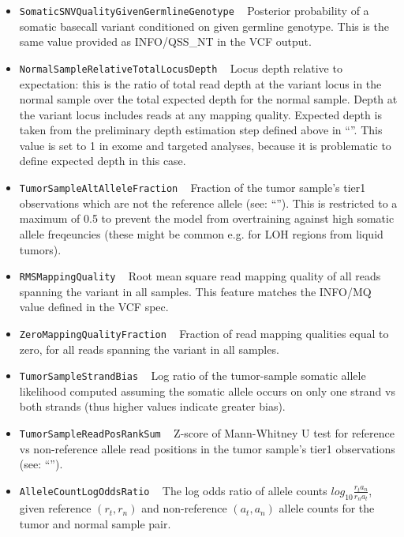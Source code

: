 \documentclass{article}
\begin{document}
\begin{itemize}

    \item \texttt{SomaticSNVQualityGivenGermlineGenotype} ~ Posterior probability of a somatic basecall variant conditioned on given germline genotype. This is the same value provided as INFO/QSS\_NT in the VCF output.

    \item \texttt{NormalSampleRelativeTotalLocusDepth} ~ Locus depth relative to expectation: this is the ratio of total read depth at the variant locus in the normal sample over the total expected depth for the normal sample. Depth at the variant locus includes reads at any mapping quality. Expected depth is taken from the preliminary depth estimation step defined above in ``''. This value is set to 1 in exome and targeted analyses, because it is problematic to define expected depth in this case.

    \item \texttt{TumorSampleAltAlleleFraction} ~ Fraction of the tumor sample's tier1 observations which are not the reference allele (see: ``''). This is restricted to a maximum of 0.5 to prevent the model from overtraining against high somatic allele freqeuncies (these might be common e.g. for LOH regions from liquid tumors).

    \item \texttt{RMSMappingQuality} ~ Root mean square read mapping quality of all reads spanning the variant in all samples. This feature matches the INFO/MQ value defined in the VCF spec.

    \item \texttt{ZeroMappingQualityFraction} ~ Fraction of read mapping qualities equal to zero, for all reads spanning the variant in all samples.

    \item \texttt{TumorSampleStrandBias} ~ Log ratio of the tumor-sample somatic allele likelihood computed assuming the somatic allele occurs on only one strand vs both strands
    (thus higher values indicate greater bias).

    \item \texttt{TumorSampleReadPosRankSum} ~ Z-score of Mann-Whitney U test for reference vs non-reference allele read positions in the tumor sample's tier1 observations (see: ``'').

    \item \texttt{AlleleCountLogOddsRatio} ~ The log odds ratio of allele counts $log_{10}{\frac{r_t a_n} {r_n a_t}}$, given reference $(r_t,r_n)$ and non-reference $(a_t,a_n)$ allele counts for the tumor and normal sample pair.

\end{itemize}



\end{document}
